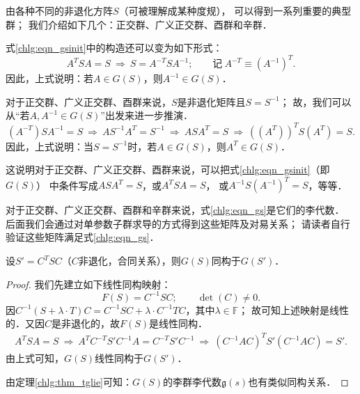 由各种不同的非退化方阵$S$（可被理解成某种度规），
可以得到一系列重要的典型群；
我们介绍如下几个：正交群、广义正交群、酉群和辛群．

式\eqref{chlg:eqn_gsinit}中的构造还可以变为如下形式：
\begin{equation}\label{chlg:eqn_invaings}
    A^T S {A} =S \ \Rightarrow \ S = A^{-T} S {A^{-1}} ; \qquad
    \text{记}\  A^{-T}\equiv ({A^{-1}})^T .
\end{equation}
因此，上式说明：若$A\in G(S)$，则$A^{-1} \in G(S)$．


对于正交群、广义正交群、酉群来说，$S$是非退化矩阵且$S=S^{-1}$；
故，我们可以从“若$A, A^{-1}\in G(S)$”出发来进一步推演．
\begin{equation*} %
    (A^{-T}) S {A^{-1}} =S \ \Rightarrow \ 
    {A} S^{-1} A^T = S^{-1} \ \Rightarrow \ {A} S A^T = S
    \ \Rightarrow \  \left({({A}^T)}\right)^T S ({A}^T) = S .
\end{equation*}
因此，上式说明：当$S=S^{-1}$时，若$A\in G(S)$，则${A}^T \in G(S)$．

这说明对于正交群、广义正交群、酉群来说，可以把式\eqref{chlg:eqn_gsinit}（即$G(S)$）
中条件写成$ A S {A}^T =S$，或$ {A}^T S A =S$，
或$  A^{-1} S ({A^{-1}})^T =S$，等等．

对于正交群、广义正交群、酉群和辛群来说，式\eqref{chlg:eqn_gs}是它们的李代数．
后面我们会通过对单参数子群求导的方式得到这些矩阵及对易关系；
请读者自行验证这些矩阵满足式\eqref{chlg:eqn_gs}．



\begin{proposition}
    设$S'= C^T S C $（$C$非退化，合同关系），则$G(S)$同构于$G(S')$．
\end{proposition}
\begin{proof}
    我们先建立如下线性同构映射：
    \begin{equation}
        F(S)=C^{-1}SC;\qquad \det(C)\neq 0.
    \end{equation}    
    因$C^{-1}(S+\lambda \cdot T)C= C^{-1}SC +\lambda \cdot C^{-1}TC $，其中$\lambda\in \mathbb{F}$；
    故可知上述映射是线性的．又因$C$是非退化的，故$F(S)$是线性同构．    
    \begin{align*}
        A^T S A = S \ \Rightarrow\ A^T C^{-T}S' C^{-1} A = C^{-T}S' C^{-1}
        \ \Rightarrow\ (C^{-1} A C)^{T} S' (C^{-1} A C) = S'  .
    \end{align*}
    由上式可知，$G(S)$线性同构于$G(S')$．
    
    由定理\ref{chlg:thm_tglie}可知：$G(S)$的李群李代数$\mathfrak{g}(s)$也有类似同构关系．
\end{proof}


